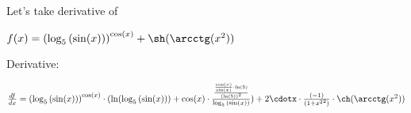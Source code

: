 \documentclass{article}
\begin{document}
Let's take derivative of

$f(x) = {(\log_{5}{(\sin(x))})}^{\cos(x)}+\sh(\arcctg({x}^{2}))$

Derivative:

$\frac{df}{dx} = {(\log_{5}{(\sin(x))})}^{\cos(x)}\cdot(\ln(\log_{5}{(\sin(x))})+\cos(x)\cdot\frac{\frac{\frac{\cos(x)}{\sin(x)}\cdot\ln(5)}{{(\ln(5))}^{2}}}{\log_{5}{(\sin(x))}})+2\cdotx\cdot\frac{(-1)}{(1+{{x}^{2}}^{2})}\cdot\ch(\arcctg({x}^{2}))$
\end{document}
